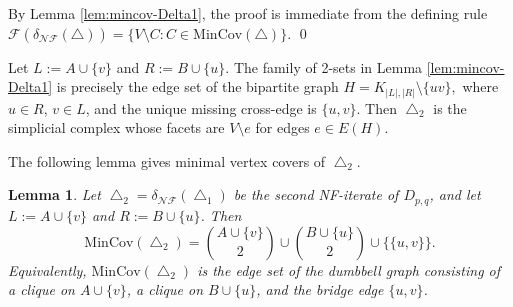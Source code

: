 \documentclass[12pt]{article}
\renewenvironment{proof}{{\noindent\bfseries Proof.}}{\qed}
\theoremstyle{plain}
\newtheorem{lemma}[theorem]{Lemma}
\theoremstyle{definition}
\newcommand{\F}{\mathcal{F}}
\newcommand{\MIN}{\mathrm{MinCov}}
\newcommand{\V}{V}
\begin{document}
		\begin{proof}
			By Lemma \ref{lem:mincov-Delta1}, the proof is immediate from the defining rule \(\F(\delta_{\mathcal{NF}}(\bigtriangleup))=\{\V\setminus C: C\in\MIN(\bigtriangleup)\}\).
		\end{proof}
		
		\medskip
		 Let \(L:=A\cup\{v\}\) and \(R:=B\cup\{u\}\). The family of 2-sets in Lemma \ref{lem:mincov-Delta1} is precisely the edge set of the bipartite graph $H  =  K_{|L|,|R|}\setminus \{uv\},$ 	where \(u\in R\), \(v\in L\), and the unique missing cross-edge is \(\{u,v\}\).
			Then \(\bigtriangleup_2\) is the simplicial complex whose facets are \(\V\setminus e\) for edges \(e\in E(H)\). 
		
		The following lemma gives minimal vertex covers of \(\bigtriangleup_2\).
		\begin{lemma}\label{lem:mincov-Delta2}
			Let \(\bigtriangleup_2=\delta_{\mathcal{NF}}(\bigtriangleup_1)\) be the second NF-iterate of \(D_{p,q}\), and
			let \(L:=A\cup\{v\}\) and \(R:=B\cup\{u\}\). 
			Then 
			\[
			\MIN(\bigtriangleup_2)=\binom{A\cup\{v\}}{2} \cup \binom{B\cup\{u\}}{2} \cup \{\{u,v\}\}.
			\]
			Equivalently, \(\MIN(\bigtriangleup_2)\) is the edge set of the dumbbell graph consisting of a clique on \(A\cup\{v\}\),
			a clique on \(B\cup\{u\}\), and the bridge edge \(\{u,v\}\).
		\end{lemma}
		
\end{document}
